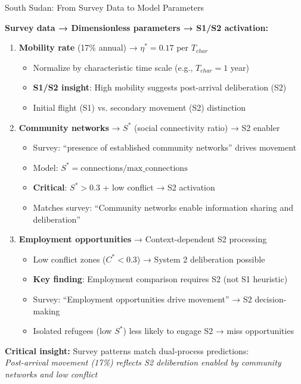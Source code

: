 \documentclass[aspectratio=169]{beamer}
\begin{document}
\begin{frame}{South Sudan: From Survey Data to Model Parameters}

\textbf{Survey data → Dimensionless parameters → S1/S2 activation:}

\begin{enumerate}
    \item \textbf{Mobility rate} (17\% annual) → $\eta^* = 0.17$ per $T_{char}$
    \begin{itemize}
        \item Normalize by characteristic time scale (e.g., $T_{char} = 1$ year)
        \item \textbf{S1/S2 insight}: High mobility suggests post-arrival deliberation (S2)
        \item Initial flight (S1) vs. secondary movement (S2) distinction
    \end{itemize}
    
    \item \textbf{Community networks} → $S^*$ (social connectivity ratio) → S2 enabler
    \begin{itemize}
        \item Survey: ``presence of established community networks'' drives movement
        \item Model: $S^* = \text{connections}/\text{max\_connections}$
        \item \textbf{Critical}: $S^* > 0.3$ + low conflict → S2 activation
        \item Matches survey: ``Community networks enable information sharing and deliberation''
    \end{itemize}
    
    \item \textbf{Employment opportunities} → Context-dependent S2 processing
    \begin{itemize}
        \item Low conflict zones ($C^* < 0.3$) → System 2 deliberation possible
        \item \textbf{Key finding}: Employment comparison requires S2 (not S1 heuristic)
        \item Survey: ``Employment opportunities drive movement'' → S2 decision-making
        \item Isolated refugees (low $S^*$) less likely to engage S2 → miss opportunities
    \end{itemize}
\end{enumerate}

\vspace{0.5em}

\textbf{Critical insight:} Survey patterns match dual-process predictions:\\
\textit{Post-arrival movement (17\%) reflects S2 deliberation enabled by community networks and low conflict}

\end{frame}
\end{document}
